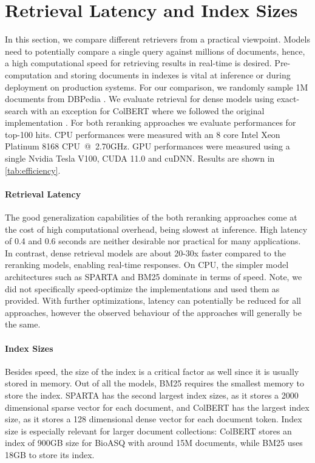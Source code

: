 \documentclass[11pt]{article}
\begin{document}
\section{Retrieval Latency and Index Sizes}

In this section, we compare different retrievers from a practical viewpoint. Models need to potentially compare a single query against millions of documents, hence, a high computational speed for retrieving results in real-time is desired. Pre-computation and storing documents in indexes is vital at inference or during deployment on production systems. For our comparison, we randomly sample 1M documents from DBPedia \cite{Hasibi:2017:DVT}. We evaluate retrieval for dense models using exact-search with an exception for ColBERT where we followed the original implementation \cite{10.1145/3397271.3401075}. For both reranking approaches we evaluate performances for top-100 hits. CPU performances were measured with an 8 core Intel Xeon Platinum 8168 CPU~@~2.70GHz. GPU performances were measured using a single Nvidia Tesla V100, CUDA 11.0 and cuDNN. Results are shown in \autoref{tab:efficiency}.

\paragraph{Retrieval Latency} The good generalization capabilities of the both reranking approaches come at the cost of high computational overhead, being slowest at inference. High latency of 0.4 and 0.6 seconds are neither desirable nor practical for many applications. In contrast, dense retrieval models are about 20-30x faster compared to the reranking models, enabling real-time responses. On CPU, the simpler model architectures such as SPARTA and BM25 dominate in terms of speed. Note, we did not specifically speed-optimize the implementations and used them as provided. With further optimizations, latency can potentially be reduced for all approaches, however the observed behaviour of the approaches will generally be the same.

\paragraph{Index Sizes} Besides speed, the size of the index is a critical factor as well since it is usually stored in memory. Out of all the models, BM25 requires the smallest memory to store the index. SPARTA has the second largest index sizes, as it stores a 2000 dimensional sparse vector for each document, and ColBERT has the largest index size, as it stores a 128 dimensional dense vector for each document token. Index size is especially relevant for larger document collections: ColBERT stores an index of 900GB size for BioASQ with around 15M documents, while BM25 uses 18GB to store its index. 
\end{document}
